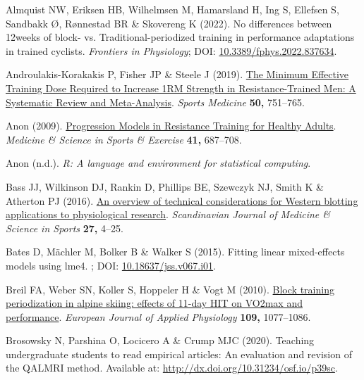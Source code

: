 \documentclass[
  letterpaper,
  DIV=11,
  numbers=noendperiod]{scrreprt}
\newlength{\cslhangindent}
\newenvironment{CSLReferences}[2] %
 {\begin{list}{}{%
  \setlength{\itemindent}{0pt}
  \setlength{\leftmargin}{0pt}
  \setlength{\parsep}{0pt}
  \ifodd #1
   \setlength{\leftmargin}{\cslhangindent}
   \setlength{\itemindent}{-1\cslhangindent}
  \fi
  \setlength{\itemsep}{#2\baselineskip}}}
 {\end{list}}
\begin{document}
\label{refs}
\begin{CSLReferences}{1}{1}
Almquist NW, Eriksen HB, Wilhelmsen M, Hamarsland H, Ing S, Ellefsen S,
Sandbakk Ø, Rønnestad BR \& Skovereng K (2022). No differences between
12{\hspace{0.167em}}weeks of block- vs. Traditional-periodized training
in performance adaptations in trained cyclists. \emph{Frontiers in
Physiology}; DOI:
\href{https://doi.org/10.3389/fphys.2022.837634}{10.3389/fphys.2022.837634}.

Androulakis-Korakakis P, Fisher JP \& Steele J (2019).
\href{https://doi.org/10.1007/s40279-019-01236-0}{The Minimum Effective
Training Dose Required to Increase 1RM Strength in Resistance-Trained
Men: A Systematic Review and Meta-Analysis}. \emph{Sports Medicine}
\textbf{50,} 751--765.

Anon (2009).
\href{https://doi.org/10.1249/mss.0b013e3181915670}{Progression Models
in Resistance Training for Healthy Adults}. \emph{Medicine \& Science in
Sports \& Exercise} \textbf{41,} 687--708.

Anon (n.d.). \emph{R: A language and environment for statistical
computing}.

Bass JJ, Wilkinson DJ, Rankin D, Phillips BE, Szewczyk NJ, Smith K \&
Atherton PJ (2016). \href{https://doi.org/10.1111/sms.12702}{An overview
of technical considerations for Western blotting applications to
physiological research}. \emph{Scandinavian Journal of Medicine \&
Science in Sports} \textbf{27,} 4--25.

Bates D, Mächler M, Bolker B \& Walker S (2015). Fitting linear
mixed-effects models using {\textbraceleft}lme4{\textbraceright}. ; DOI:
\href{https://doi.org/10.18637/jss.v067.i01}{10.18637/jss.v067.i01}.

Breil FA, Weber SN, Koller S, Hoppeler H \& Vogt M (2010).
\href{https://doi.org/10.1007/s00421-010-1455-1}{Block training
periodization in alpine skiing: effects of 11-day HIT on VO2max and
performance}. \emph{European Journal of Applied Physiology}
\textbf{109,} 1077--1086.

Brosowsky N, Parshina O, Locicero A \& Crump MJC (2020). Teaching
undergraduate students to read empirical articles: An evaluation and
revision of the QALMRI method. Available at:
\url{http://dx.doi.org/10.31234/osf.io/p39sc}.


\end{CSLReferences}
\end{document}
